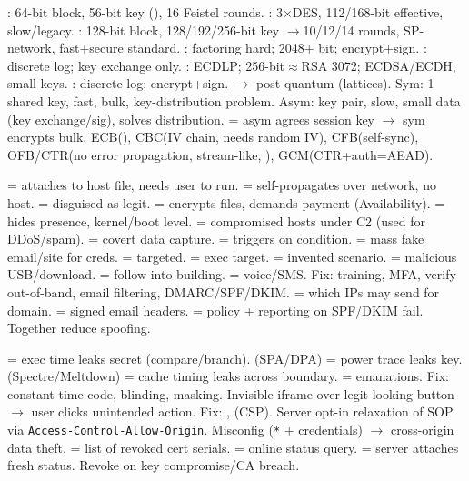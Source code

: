 : 64-bit block, 56-bit key (), 16 Feistel rounds. : 3$\times$DES, 112/168-bit effective, slow/legacy. : 128-bit block, 128/192/256-bit key $\to$10/12/14 rounds, SP-network, fast+secure standard.
: factoring hard; 2048+ bit; encrypt+sign. : discrete log; key exchange only. : ECDLP; 256-bit$\approx$RSA 3072; ECDSA/ECDH, small keys. : discrete log; encrypt+sign.  $\to$ post-quantum (lattices).
Sym: 1 shared key, fast, bulk, key-distribution problem. Asym: key pair, slow, small data (key exchange/sig), solves distribution.  = asym agrees session key $\to$ sym encrypts bulk.
ECB(), CBC(IV chain, needs random IV), CFB(self-sync), OFB/CTR(no error propagation, stream-like, ), GCM(CTR+auth=AEAD).

 = attaches to host file, needs user to run.  = self-propagates over network, no host.  = disguised as legit.  = encrypts files, demands payment (Availability).  = hides presence, kernel/boot level.  = compromised hosts under C2 (used for DDoS/spam).  = covert data capture.  = triggers on condition.
 = mass fake email/site for creds.  = targeted.  = exec target.  = invented scenario.  = malicious USB/download.  = follow into building.  = voice/SMS. Fix: training, MFA, verify out-of-band, email filtering, DMARC/SPF/DKIM.
 = which IPs may send for domain.  = signed email headers.  = policy + reporting on SPF/DKIM fail. Together reduce spoofing.

 = exec time leaks secret (compare/branch).  (SPA/DPA) = power trace leaks key.  (Spectre/Meltdown) = cache timing leaks across boundary.  = emanations. Fix: constant-time code, blinding, masking.
Invisible iframe over legit-looking button $\to$ user clicks unintended action. Fix: ,  (CSP).
Server opt-in relaxation of SOP via \texttt{Access-Control-Allow-Origin}. Misconfig (\texttt{*} + credentials) $\to$ cross-origin data theft.
 = list of revoked cert serials.  = online status query.  = server attaches fresh status. Revoke on key compromise/CA breach.

